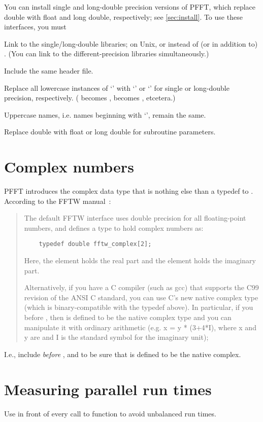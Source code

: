 You can install single and long-double precision versions of PFFT, which replace double with float and long double, respectively; see \ref{sec:install}.
To use these interfaces, you must
\begin{compactitem}
  \item Link to the single/long-double libraries; on Unix,  or  instead of (or in addition to) .
        (You can link to the different-precision libraries simultaneously.)
  \item Include the same  header file.
  \item Replace all lowercase instances of ‘’ with ‘’ or ‘’ for single or long-double precision, respectively.
        ( becomes ,  becomes , etcetera.)
  \item Uppercase names, i.e. names beginning with ‘’, remain the same.
  \item Replace double with float or long double for subroutine parameters.
\end{compactitem}

\section{Complex numbers}
PFFT introduces the complex data type  that is nothing else than a typedef to .
According to the FFTW manual~\cite{fftw-cplx-num}:
\begin{quote}
  The default FFTW interface uses double precision for all floating-point numbers, and defines a  type to hold complex numbers as:
  \begin{lstlisting}
    typedef double fftw_complex[2];
  \end{lstlisting}
  Here, the \code{[0]} element holds the real part and the \code{[1]} element holds the imaginary part.

  Alternatively, if you have a C compiler (such as gcc) that supports the C99 revision of the ANSI C standard,
  you can use C's new native complex type (which is binary-compatible with the typedef above).
  In particular, if you  before , then  is defined to be the native complex
  type and you can manipulate it with ordinary arithmetic (e.g. x = y * (3+4*I), where x and y are 
  and I is the standard symbol for the imaginary unit);
\end{quote}
I.e., include  \emph{before} ,  and  to be sure that  is defined to be the native complex.

\section{Measuring parallel run times}
Use  in front of every call to  function to avoid unbalanced run times.
